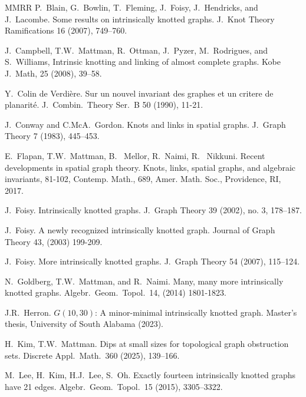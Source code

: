 \documentclass{amsart}
\theoremstyle{remark}
\begin{document}
{\begin{thebibliography}{MMRR}
 P.~Blain, G.~Bowlin, T.~Fleming, J.~Foisy, J.~Hendricks, and
J.~Lacombe. Some results on intrinsically knotted graphs.
 J.~Knot Theory Ramifications  16  (2007), 749--760.

 J.\ Campbell, T.W.\ Mattman, R.\ Ottman, J.\ Pyzer, M.\ Rodrigues, and S.\ Williams,
Intrinsic knotting and linking of almost complete graphs. 
Kobe J.~Math,  25  (2008), 39--58.
 
  Y.~Colin de Verdi\`{e}re. 
 Sur un nouvel invariant des graphes et un critere de planarit\'e. 
 J.~Combin.~Theory Ser.~B 50 (1990), 11-21.

J.~Conway and C.McA.~Gordon.  Knots and links in spatial graphs.
 J.~Graph Theory  7  (1983),  445--453.


E.~Flapan, T.W.~Mattman, B.~ Mellor, R.~Naimi, R. ~Nikkuni. Recent developments in spatial graph theory.
 Knots, links, spatial graphs, and algebraic invariants, 
 81-102, Contemp. Math., 689, Amer. Math. Soc., Providence, RI,  2017. 

 J.~Foisy. Intrinsically knotted graphs.
 J.~Graph Theory  39  (2002),  no. 3, 178--187.
 
 J.~Foisy. A newly recognized intrinsically knotted graph. Journal of Graph Theory 43, (2003) 199-209. 

 J.~Foisy.
More intrinsically knotted graphs.
J.~Graph Theory 54 (2007), 115–124.

 N.~Goldberg, T.W.~Mattman, and R.~Naimi. Many, many more intrinsically knotted graphs.  Algebr.~Geom.~Topol.~14, (2014) 1801-1823.

 J.R.~Herron. $G(10,30)$: A minor-minimal intrinsically knotted graph. Master's thesis, University of South Alabama (2023).


H.~Kim, T.W.~Mattman.
Dips at small sizes for topological graph obstruction sets.
Discrete Appl.~Math.~360 (2025), 139–166.

M.~Lee, H.~Kim, H.J.~Lee, S.~Oh.
Exactly fourteen intrinsically knotted graphs have 21 edges.
Algebr.~Geom.~Topol.~15 (2015), 3305–3322.


\end{thebibliography}}
\end{document}
